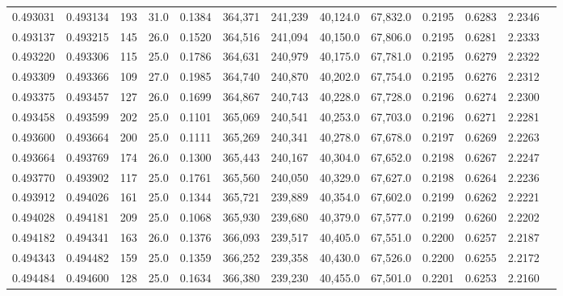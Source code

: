 \begin{tabular}{rrrrrrrrrrrrr}
0.493031 & 0.493134 &   193 & 31.0 &                                     0.1384 & 364,371 & 241,239 &  40,124.0 &  67,832.0 & 0.2195 & 0.6283 & 2.2346 \\
0.493137 & 0.493215 &   145 & 26.0 &                                     0.1520 & 364,516 & 241,094 &  40,150.0 &  67,806.0 & 0.2195 & 0.6281 & 2.2333 \\
0.493220 & 0.493306 &   115 & 25.0 &                                     0.1786 & 364,631 & 240,979 &  40,175.0 &  67,781.0 & 0.2195 & 0.6279 & 2.2322 \\
0.493309 & 0.493366 &   109 & 27.0 &                                     0.1985 & 364,740 & 240,870 &  40,202.0 &  67,754.0 & 0.2195 & 0.6276 & 2.2312 \\
0.493375 & 0.493457 &   127 & 26.0 &                                     0.1699 & 364,867 & 240,743 &  40,228.0 &  67,728.0 & 0.2196 & 0.6274 & 2.2300 \\
0.493458 & 0.493599 &   202 & 25.0 &                                     0.1101 & 365,069 & 240,541 &  40,253.0 &  67,703.0 & 0.2196 & 0.6271 & 2.2281 \\
0.493600 & 0.493664 &   200 & 25.0 &                                     0.1111 & 365,269 & 240,341 &  40,278.0 &  67,678.0 & 0.2197 & 0.6269 & 2.2263 \\
0.493664 & 0.493769 &   174 & 26.0 &                                     0.1300 & 365,443 & 240,167 &  40,304.0 &  67,652.0 & 0.2198 & 0.6267 & 2.2247 \\
0.493770 & 0.493902 &   117 & 25.0 &                                     0.1761 & 365,560 & 240,050 &  40,329.0 &  67,627.0 & 0.2198 & 0.6264 & 2.2236 \\
0.493912 & 0.494026 &   161 & 25.0 &                                     0.1344 & 365,721 & 239,889 &  40,354.0 &  67,602.0 & 0.2199 & 0.6262 & 2.2221 \\
0.494028 & 0.494181 &   209 & 25.0 &                                     0.1068 & 365,930 & 239,680 &  40,379.0 &  67,577.0 & 0.2199 & 0.6260 & 2.2202 \\
0.494182 & 0.494341 &   163 & 26.0 &                                     0.1376 & 366,093 & 239,517 &  40,405.0 &  67,551.0 & 0.2200 & 0.6257 & 2.2187 \\
0.494343 & 0.494482 &   159 & 25.0 &                                     0.1359 & 366,252 & 239,358 &  40,430.0 &  67,526.0 & 0.2200 & 0.6255 & 2.2172 \\
0.494484 & 0.494600 &   128 & 25.0 &                                     0.1634 & 366,380 & 239,230 &  40,455.0 &  67,501.0 & 0.2201 & 0.6253 & 2.2160 \\

\end{tabular}
